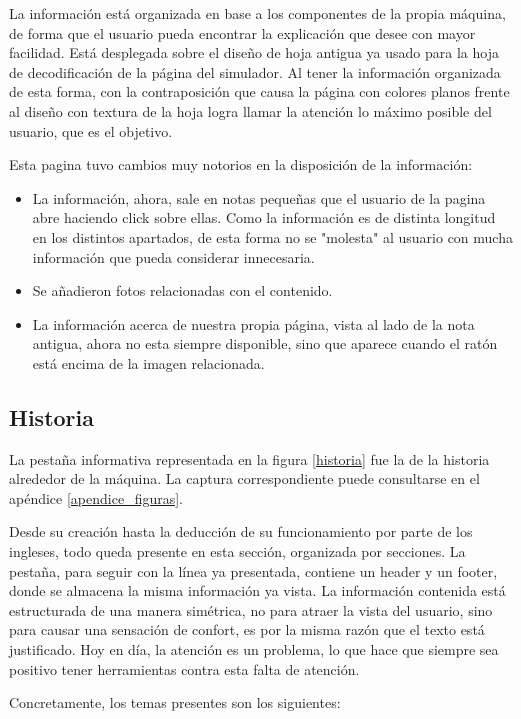 La información está organizada en base a los componentes de la propia máquina, de forma que el usuario pueda encontrar la explicación que desee con mayor facilidad. Está desplegada sobre el diseño de hoja antigua ya usado para la hoja de decodificación de la página del simulador. Al tener la información organizada de esta forma, con la contraposición que causa la página con colores planos frente al diseño con textura de la hoja logra llamar la atención lo máximo posible del usuario, que es el objetivo. 

Esta pagina tuvo cambios muy notorios en la disposición de la información:
\begin{itemize}
	\item La información, ahora, sale en notas pequeñas que el usuario de la pagina abre haciendo click sobre ellas. Como la información es de distinta longitud en los distintos apartados, de esta forma no se "molesta" al usuario con mucha información que pueda considerar innecesaria.
	\item Se añadieron fotos relacionadas con el contenido.
	\item La información acerca de nuestra propia página, vista al lado de la nota antigua, ahora no esta siempre disponible, sino que aparece cuando el ratón está encima de la imagen relacionada.
\end{itemize}

\subsection{Historia}

La pestaña informativa representada en la figura \ref{historia} fue la de la historia alrededor de la máquina. La captura correspondiente puede consultarse en el apéndice \ref{apendice_figuras}.

Desde su creación hasta la deducción de su funcionamiento por parte de los ingleses, todo queda presente en esta sección, organizada por secciones.
La pestaña, para seguir con la línea ya presentada, contiene un header y un footer, donde se almacena la misma información ya vista. 
La información contenida está estructurada de una manera simétrica, no para atraer la vista del usuario, sino para causar una sensación de confort, es por la misma razón que el texto está justificado. Hoy en día, la atención es un problema, lo que hace que siempre sea positivo tener herramientas contra esta falta de atención.

Concretamente, los temas presentes son los siguientes:


